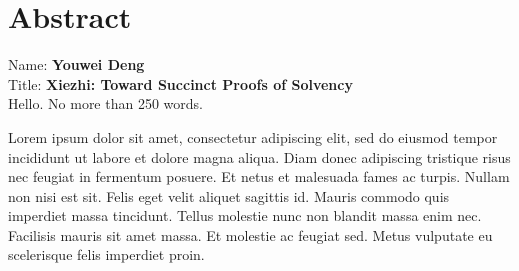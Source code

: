 
\chapter*{Abstract}

Name: 	\tab \textbf{Youwei Deng} \\
Title: 	\tab \textbf{Xiezhi: Toward Succinct Proofs of Solvency}\\

Hello. No more than 250 words.

Lorem ipsum dolor sit amet, consectetur adipiscing elit, sed do eiusmod tempor incididunt ut labore et dolore magna aliqua. Diam donec adipiscing tristique risus nec feugiat in fermentum posuere. Et netus et malesuada fames ac turpis. Nullam non nisi est sit. Felis eget velit aliquet sagittis id. Mauris commodo quis imperdiet massa tincidunt. Tellus molestie nunc non blandit massa enim nec. Facilisis mauris sit amet massa. Et molestie ac feugiat sed. Metus vulputate eu scelerisque felis imperdiet proin.



